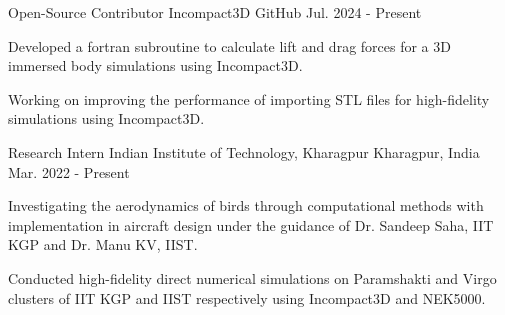 

\begin{cventries}
  \cventry
  {Open-Source Contributor} %
  {Incompact3D} %
  {GitHub} %
  {Jul. 2024 - Present} %
  {
    \begin{cvitems} %
      \item {Developed a fortran subroutine to calculate lift and drag forces for a 3D immersed body simulations using Incompact3D.}
      \item {Working on improving the performance of importing STL files for high-fidelity simulations using Incompact3D.}
    \end{cvitems}
  }

  \cventry
  {Research Intern} %
  {Indian Institute of Technology, Kharagpur} %
  {Kharagpur, India} %
  {Mar. 2022 - Present} %
  {
    \begin{cvitems} %
      \item {Investigating the aerodynamics of birds through computational methods with implementation in aircraft design under the guidance of Dr. Sandeep Saha, IIT KGP and Dr. Manu KV, IIST.}
      \item {Conducted high-fidelity direct numerical simulations on Paramshakti and Virgo clusters of IIT KGP and IIST respectively using Incompact3D and NEK5000.}
    \end{cvitems}
  }
\end{cventries}
